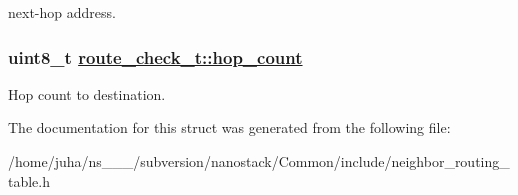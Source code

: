 next-hop address. \hypertarget{structroute__check__t_b0c86ee96d76aa0b4de637e3eea1c831}{
\subsubsection[hop\_\-count]{\setlength{\rightskip}{0pt plus 5cm}uint8\_\-t \hyperlink{structroute__check__t_b0c86ee96d76aa0b4de637e3eea1c831}{route\_\-check\_\-t::hop\_\-count}}}
\label{structroute__check__t_b0c86ee96d76aa0b4de637e3eea1c831}


Hop count to destination. 

The documentation for this struct was generated from the following file:\begin{CompactItemize}
\item 
/home/juha/ns\_\_\_/subversion/nanostack/Common/include/neighbor\_\-routing\_\-table.h\end{CompactItemize}
